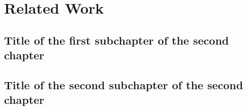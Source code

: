 \chapter{Related Work}

\section{Title of the first subchapter of the second chapter}

\section{Title of the second subchapter of the second chapter}

